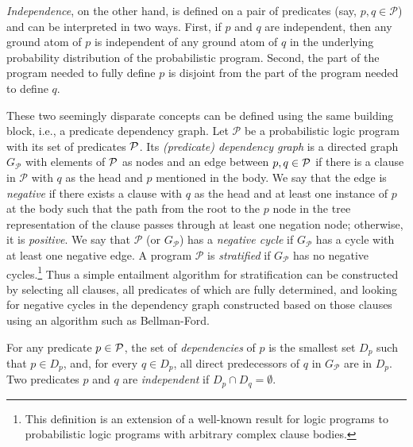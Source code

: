\emph{Independence}, on the other hand, is defined on a pair of predicates (say,
$p, q \in \mathcal{P}$) and can be interpreted in two ways. First, if $p$ and
$q$ are independent, then any ground atom of $p$ is independent of any ground
atom of $q$ in the underlying probability distribution of the probabilistic
program. Second, the part of the program needed to fully define $p$ is disjoint
from the part of the program needed to define $q$.

These two seemingly disparate concepts can be defined using the same building
block, i.e., a predicate dependency graph. Let $\mathscr{P}$ be a probabilistic
logic program with its set of predicates $\mathcal{P}{}$. Its \emph{(predicate)
  dependency graph} is a directed graph $G_{\mathscr{P}}$ with elements of
$\mathcal{P}{}$ as nodes and an edge between $p, q \in \mathcal{P}{}$ if there
is a clause in $\mathscr{P}$ with $q$ as the head and $p$ mentioned in the body.
We say that the edge is \emph{negative} if there exists a clause with $q$ as the
head and at least one instance of $p$ at the body such that the path from the
root to the $p$ node in the tree representation of the clause passes through at
least one negation node; otherwise, it is \emph{positive}. We say that
$\mathscr{P}$ (or $G_{\mathscr{P}}$) has a \emph{negative cycle} if
$G_{\mathscr{P}}$ has a cycle with at least one negative edge. A program
$\mathscr{P}$ is \emph{stratified} if $G_{\mathscr{P}}$ has no negative
cycles.\footnote{This definition is an extension of a well-known result for
  logic programs \citep{DBLP:journals/jlp/BalbinPRM91} to probabilistic logic
  programs with arbitrary complex clause bodies.} Thus a simple entailment
algorithm for stratification can be constructed by selecting all clauses, all
predicates of which are fully determined, and looking for negative cycles in the
dependency graph constructed based on those clauses using an algorithm such as
Bellman-Ford.

For any predicate $p \in \mathcal{P}{}$, the set of \emph{dependencies} of $p$
is the smallest set $D_{p}$ such that $p \in D_{p}$, and, for every
$q \in D_{p}$, all direct predecessors of $q$ in $G_{\mathscr{P}}$ are in
$D_{p}$. Two predicates $p$ and $q$ are \emph{independent} if
$D_{p} \cap D_{q} = \emptyset$.

